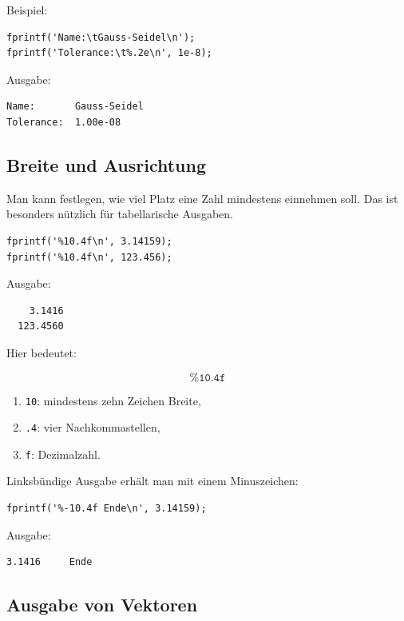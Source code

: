 \documentclass[10pt, letterpaper]{article}
\begin{document}
Beispiel:

\begin{verbatim}
fprintf('Name:\tGauss-Seidel\n');
fprintf('Tolerance:\t%.2e\n', 1e-8);
\end{verbatim}

Ausgabe:

\begin{verbatim}
Name:       Gauss-Seidel
Tolerance:  1.00e-08
\end{verbatim}

\subsection{Breite und Ausrichtung}

Man kann festlegen, wie viel Platz eine Zahl mindestens einnehmen soll. Das ist besonders nützlich für tabellarische Ausgaben.

\begin{verbatim}
fprintf('%10.4f\n', 3.14159);
fprintf('%10.4f\n', 123.456);
\end{verbatim}

Ausgabe:

\begin{verbatim}
    3.1416
  123.4560
\end{verbatim}

Hier bedeutet:

\[
\texttt{\%10.4f}
\]

\begin{enumerate}
    \item \texttt{10}: mindestens zehn Zeichen Breite,
    \item \texttt{.4}: vier Nachkommastellen,
    \item \texttt{f}: Dezimalzahl.
\end{enumerate}

Linksbündige Ausgabe erhält man mit einem Minuszeichen:

\begin{verbatim}
fprintf('%-10.4f Ende\n', 3.14159);
\end{verbatim}

Ausgabe:

\begin{verbatim}
3.1416     Ende
\end{verbatim}

\subsection{Ausgabe von Vektoren}
\end{document}
